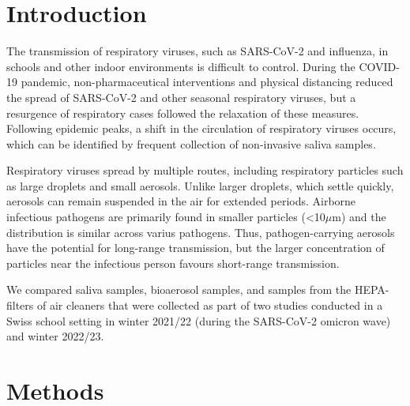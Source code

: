 \documentclass[fleqn,11pt]{wlscirep}
\begin{document}
\thispagestyle{empty}
\sloppy
\raggedbottom

\newpage

\setcounter{page}{1}

\section*{Introduction}

The transmission of respiratory viruses, such as SARS-CoV-2 and influenza, in schools and other indoor environments is difficult to control\cite{Leung2020NatMed}. During the COVID-19 pandemic, non-pharmaceutical interventions and physical distancing reduced the spread of SARS-CoV-2 and other seasonal respiratory viruses, but a resurgence of respiratory cases followed the relaxation of these measures\cite{Poole2020LancetRespMed,Sauteur2022EuroSurv,Kandeel2023BMC}. Following epidemic peaks, a shift in the circulation of respiratory viruses occurs\cite{Pierangeli2012CMI}, which can be identified by frequent collection of non-invasive saliva samples\cite{Pasomsub2021CMI}. 

Respiratory viruses spread by multiple routes, including respiratory particles such as large droplets and small aerosols. Unlike larger droplets, which settle quickly, aerosols can remain suspended in the air for extended periods\cite{Wang2021}. Airborne infectious pathogens are primarily found in smaller particles (<10$\mu$m) and the distribution is similar across varius pathogens\cite{Fennelly2020}. Thus, pathogen-carrying aerosols have the potential for long-range transmission, but the larger concentration of particles near the infectious person favours short-range transmission\cite{Wang2020}. 


We compared saliva samples, bioaerosol samples, and samples from the HEPA-filters of air cleaners that were collected as part of two studies conducted in a Swiss school setting in winter 2021/22 (during the SARS-CoV-2 omicron wave)\cite{Banholzer2023PLoSMed} and winter 2022/23\cite{Banholzer2023medRxiv}. 


\section*{Methods}
\end{document}
